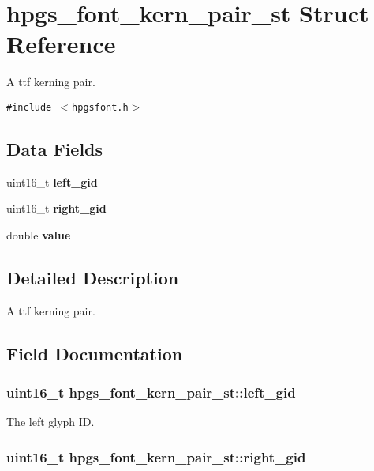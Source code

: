 \section{hpgs\_\-font\_\-kern\_\-pair\_\-st Struct Reference}
\label{structhpgs__font__kern__pair__st}
A ttf kerning pair.  


{\tt \#include $<$hpgsfont.h$>$}

\subsection*{Data Fields}
\begin{CompactItemize}
\item 
uint16\_\-t {\bf left\_\-gid}
\item 
uint16\_\-t {\bf right\_\-gid}
\item 
double {\bf value}
\end{CompactItemize}


\subsection{Detailed Description}
A ttf kerning pair. 

\subsection{Field Documentation}
\subsubsection[left\_\-gid]{\setlength{\rightskip}{0pt plus 5cm}uint16\_\-t {\bf hpgs\_\-font\_\-kern\_\-pair\_\-st::left\_\-gid}}\label{structhpgs__font__kern__pair__st_7f872ad15661ae1d46be65cdf9d720a5}


The left glyph ID. 
\subsubsection[right\_\-gid]{\setlength{\rightskip}{0pt plus 5cm}uint16\_\-t {\bf hpgs\_\-font\_\-kern\_\-pair\_\-st::right\_\-gid}}\label{structhpgs__font__kern__pair__st_54b869c6f5ab7fc34afe284ef374ecde}



